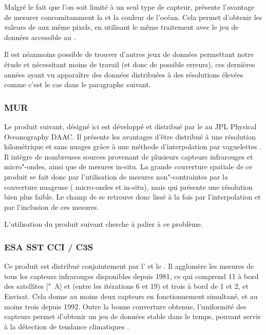 \documentclass[index]{subfiles}
\begin{document}
Malgré le fait que l'on soit limité à un seul type de capteur,  présente l'avantage de mesurer concomitamment la  et la couleur de l'océan.
Cela permet d'obtenir les valeurs de  aux même pixels, en utilisant le même traitement avec le jeu de données accessible au  \parencite{chl_modis}.

Il est néanmoins possible de trouver d'autres jeux de données permettant notre étude et nécessitant moins de travail (et donc de possible erreurs), ces dernières années ayant vu apparaître des données distribuées à des résolutions élevées comme c'est le cas dans le paragraphe suivant.

\subsubsection{MUR}
\label{sec:donnees-sst-mur}

Le produit suivant, désigné ici  est développé et distribué par le  au JPL Physical Oceanography DAAC.
Il présente les avantages d'être distribué à une résolution kilométrique et sans nuages grâce à une méthode d'interpolation par vaguelettes \parencite{chin_2017}.
Il intègre de nombreuses sources provenant de plusieurs capteurs infrarouges et micro"-ondes, ainsi que de mesures in-situ.
La grande couverture spatiale de ce produit se fait donc par l'utilisation de mesures non"-contraintes par la couverture nuageuse ( micro-ondes et in-situ), mais qui présente une résolution bien plus faible.
Le champ de  se retrouve donc lissé à la fois par l'interpolation et par l'inclusion de ces mesures.

L'utilisation du produit suivant cherche à palier à ce problème.

\subsubsection{ESA SST CCI / C3S}
\label{sec:donnees-sst-esacci}

Ce produit est distribué conjointement par l'   et le .
Il agglomère les mesures de tous les capteurs infrarouges disponibles depuis 1981, ce qui comprend 11  à bord des satellites ["~A] et  (entre les itérations 6 et 19) et trois  à bord de  1 et 2, et Envisat.
Cela donne au moins deux capteurs en fonctionnement simultané, et au moins trois depuis 1992.
Outre la bonne couverture obtenue, l'uniformité des capteurs permet d'obtenir un jeu de données stable dans le temps, pouvant servir à la détection de tendance climatiques \parencite{merchant_2019}.
\end{document}
